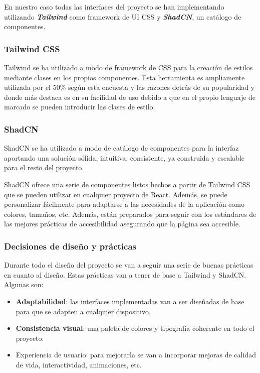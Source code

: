 En nuestro caso todas las interfaces del proyecto se han implementando utilizando \textbf{\textit{Tailwind}} como framework de UI CSS y \textbf{\textit{ShadCN}}, un catálogo de componentes.

\subsubsection{Tailwind CSS}

Tailwind se ha utilizado a modo de framework de CSS para la creación de estilos mediante clases en los propios componentes. Esta herramienta es ampliamente utilizada por el 50\% según esta encuesta y las razones detrás de su popularidad y donde más destaca es en su facilidad de uso debido a que en el propio lenguaje de marcado se pueden introducir las clases de estilo.

\subsubsection{ShadCN}

ShadCN se ha utilizado a modo de catálogo de componentes para la interfaz aportando una solución sólida, intuitiva, consistente, ya construida y escalable para el resto del proyecto.

ShadCN ofrece una serie de componentes listos hechos a partir de Tailwind CSS que se pueden utilizar en cualquier proyecto de React. Además, se puede personalizar fácilmente para adaptarse a las necesidades de la aplicación como colores, tamaños, etc. Además, están preparados para seguir con los estándares de las mejores prácticas de accesibilidad asegurando que la página sea accesible.

\subsubsection{Decisiones de diseño y prácticas}

Durante todo el diseño del proyecto se van a seguir una serie de buenas prácticas en cuanto al diseño. Estas prácticas van a tener de base a Tailwind y ShadCN. Algunas son:

\begin{itemize}
    \item \textbf{Adaptabilidad}: las interfaces implementadas van a ser diseñadas de base para que se adapten a cualquier dispositivo.
    \item \textbf{Consistencia visual}: una paleta de colores y tipografía coherente en todo el proyecto.
    \item Experiencia de usuario: para mejorarla se van a incorporar mejoras de calidad de vida, interactividad, animaciones, etc.
\end{itemize}

